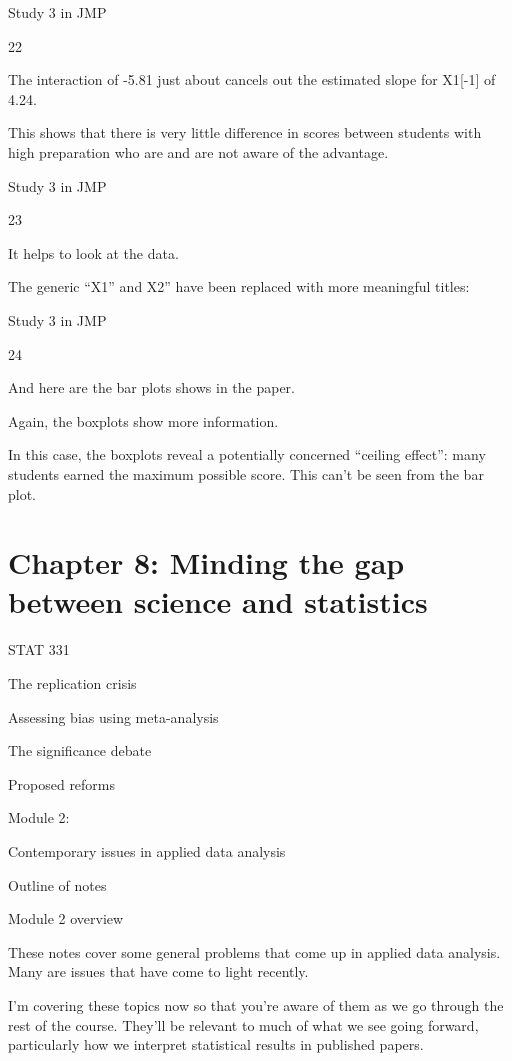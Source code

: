 \documentclass[
  letterpaper,
  DIV=11,
  numbers=noendperiod]{scrreprt}
\begin{document}
Study 3 in JMP

22

The interaction of -5.81 just about cancels out the estimated slope for
X1{[}-1{]} of 4.24.

This shows that there is very little difference in scores between
students with high preparation who are and are not aware of the
advantage.

Study 3 in JMP

23

It helps to look at the data.

The generic ``X1'' and X2'' have been replaced with more meaningful
titles:

Study 3 in JMP

24

And here are the bar plots shows in the paper.

Again, the boxplots show more information.

In this case, the boxplots reveal a potentially concerned ``ceiling
effect'': many students earned the maximum possible score. This can't be
seen from the bar plot.


\hypertarget{chapter-8-minding-the-gap-between-science-and-statistics}{%
\chapter{Chapter 8: Minding the gap between science and
statistics}\label{chapter-8-minding-the-gap-between-science-and-statistics}}

STAT 331

The replication crisis

Assessing bias using meta-analysis

The significance debate

Proposed reforms

Module 2:

Contemporary issues in applied data analysis

Outline of notes

Module 2 overview

These notes cover some general problems that come up in applied data
analysis. Many are issues that have come to light recently.

I'm covering these topics now so that you're aware of them as we go
through the rest of the course. They'll be relevant to much of what we
see going forward, particularly how we interpret statistical results in
published papers.
\end{document}

